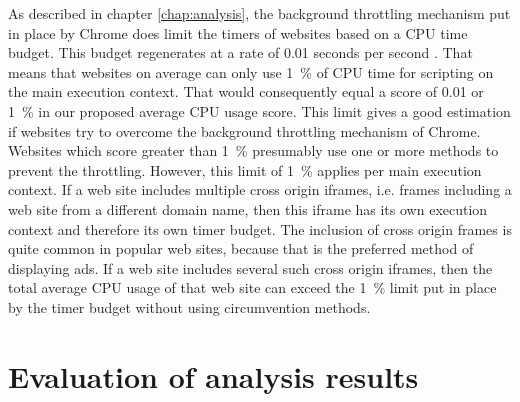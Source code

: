 \documentclass[
	ruledheaders=section,%
	class=report,%
	thesis={type=bachelor},%
	accentcolor=9c,%
	custommargins=true,%
	marginpar=false,%
	parskip=half-,%
	fontsize=11pt,%
]{tudapub}
\begin{document}
  As described in chapter \ref{chap:analysis}, the background throttling mechanism put in place by Chrome does limit the timers of websites based on a CPU time budget. This budget regenerates at a rate of 0.01 seconds per second \cite{chrome-background-tabs}. That means that websites on average can only use 1~\% of CPU time for scripting on the main execution context. That would consequently equal a score of 0.01 or 1~\% in our proposed average CPU usage score. This limit gives a good estimation if websites try to overcome the background throttling mechanism of Chrome. Websites which score greater than 1~\% presumably use one or more methods to prevent the throttling. However, this limit of 1~\% applies per main execution context. If a web site includes multiple cross origin iframes, i.e. frames including a web site from a different domain name, then this iframe has its own execution context and therefore its own timer budget. The inclusion of cross origin frames is quite common in popular web sites, because that is the preferred method of displaying ads. If a web site includes several such cross origin iframes, then the total average CPU usage of that web site can exceed the 1~\% limit put in place by the timer budget without using circumvention methods.

  
  \section{Evaluation of analysis results}
\end{document}
